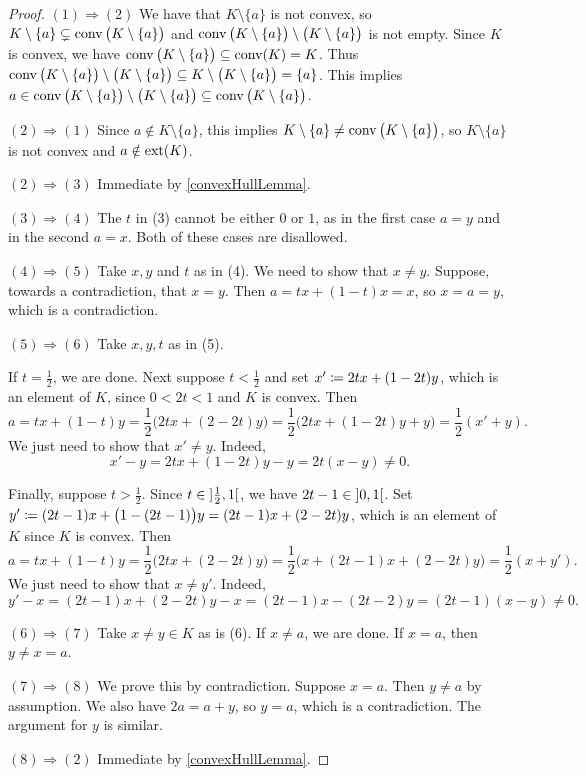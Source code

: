 \begin{proof}
$(1) \Rightarrow (2)$ We have that $K\setminus\{a\}$ is not convex, so $K\setminus \{a\} \subsetneq \operatorname{conv}\big(K\setminus \{a\}\big)$ and $\operatorname{conv}\big(K\setminus \{a\}\big) \setminus \big(K\setminus\{a\}\big)$ is not empty. Since $K$ is convex, we have $\operatorname{conv}\big(K\setminus \{a\}\big) \subseteq \operatorname{conv}(K) = K$. Thus $\operatorname{conv}\big(K\setminus \{a\}\big) \setminus \big(K\setminus\{a\}\big) \subseteq K \setminus\big(K\setminus \{a\}\big) = \{a\}$. This implies $a \in \operatorname{conv}\big(K\setminus \{a\}\big) \setminus \big(K\setminus\{a\}\big) \subseteq \operatorname{conv}\big(K\setminus \{a\}\big)$.

$(2) \Rightarrow (1)$ Since $a\notin K\setminus \{a\}$, this implies $K\setminus\{a\} \neq \operatorname{conv}\big(K\setminus \{a\}\big)$, so $K\setminus\{a\}$ is not convex and $a\notin \operatorname{ext}(K)$.

$(2) \Rightarrow (3)$ Immediate by \ref{convexHullLemma}.

$(3) \Rightarrow (4)$ The $t$ in (3) cannot be either $0$ or $1$, as in the first case $a = y$ and in the second $a = x$. Both of these cases are disallowed.

$(4) \Rightarrow (5)$ Take $x,y$ and $t$ as in (4). We need to show that $x\neq y$. Suppose, towards a contradiction, that $x=y$. Then $a = tx + (1-t)x = x$, so $x=a=y$, which is a contradiction.

$(5) \Rightarrow (6)$ Take $x,y,t$ as in (5). 

If $t = \frac{1}{2}$, we are done. Next suppose $t<\frac{1}{2}$ and set $x' \coloneqq 2tx + (1-2t)y$, which is an element of $K$, since $0<2t<1$ and $K$ is convex. Then
\[ a = tx + (1-t)y = \frac{1}{2}\big(2tx + (2-2t)y\big) = \frac{1}{2}\big(2tx + (1-2t)y + y\big) = \frac{1}{2}(x' + y). \]
We just need to show that $x' \neq y$. Indeed,
\[ x' - y = 2tx + (1-2t)y - y = 2t(x-y) \neq 0. \]

Finally, suppose $t>\frac{1}{2}$. Since $t\in \interval[o]{\frac{1}{2}, 1}$, we have $2t-1 \in \interval[o]{0, 1}$. Set $y'\coloneqq (2t-1)x + \big(1-(2t-1)\big)y= (2t-1)x + (2-2t)y$, which is an element of $K$ since $K$ is convex. Then
\[ a = tx + (1-t)y = \frac{1}{2}\big(2tx + (2-2t)y\big) = \frac{1}{2}\big(x + (2t-1)x + (2-2t)y\big) = \frac{1}{2}(x+y'). \]
We just need to show that $x \neq y'$. Indeed,
\[ y' - x = (2t-1)x + (2-2t)y - x = (2t-1)x - (2t-2)y = (2t-1)(x-y) \neq 0. \]

$(6) \Rightarrow (7)$ Take $x \neq y\in K$ as is (6).  If $x\neq a$, we are done. If $x=a$, then $y \neq x=a$. 

$(7) \Rightarrow (8)$ We prove this by contradiction. Suppose $x = a$. Then $y \neq a$ by assumption. We also have $2a = a+y$, so $y=a$, which is a contradiction. The argument for $y$ is similar.


$(8) \Rightarrow (2)$ Immediate by \ref{convexHullLemma}.
\end{proof}

